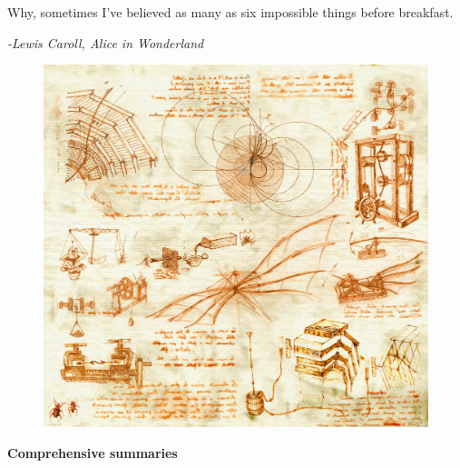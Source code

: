 \cleardoublepage\thispagestyle{empty}

\begin{center}
	\epigraph{Why, sometimes I've believed as many as six impossible things before breakfast.}{\textit{-Lewis Caroll, Alice in Wonderland}}
	
	\vspace*{10mm}
     


	
\begin{figure}[th]
	\centering
	\includegraphics[width=1.\linewidth]{./cover/oreach-2009-001_16}
\end{figure}
\vspace{10mm}
	\huge \textbf{Comprehensive summaries}

	\vspace{10mm}



\end{center}

\cleardoublepage
\setlength{\topmargin}{0mm}
\normalsize%
